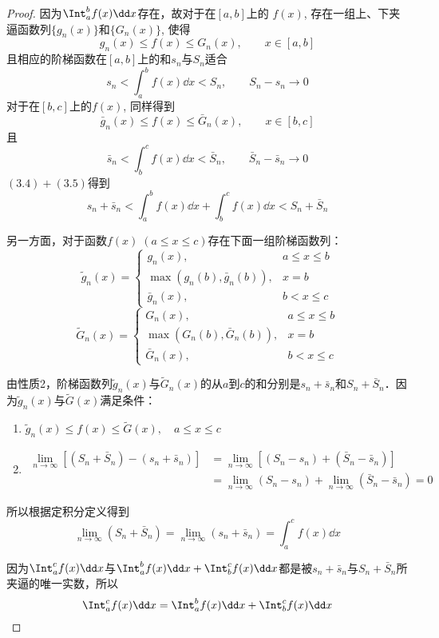 \begin{proof}
因为$\Int^b_a f(x)\dd x$存在，故对于在$[a,b]$上的
$f(x)$, 存在一组上、下夹逼函数列$\{g_n(x)\}$和$\{G_n(x)\}$, 使得
\[g_n (x) \le f (x) \le G_n (x),\qquad x\in [a,b]\]
且相应的阶梯函数在$[a,b]$上的和$s_n$与$S_n$适合
\begin{equation}
    s_n<\int^b_a f(x)\dd x<S_n,\qquad S_n-s_n\to 0
\end{equation}
对于在$[b,c]$上的$f(x)$, 同样得到
\[\bar g_n (x) \le f (x) \le \bar G_n (x),\qquad x\in [b,c]\]
且
\begin{equation}
    \bar  s_n<\int^c_b f(x)\dd x<\bar S_n,\qquad \bar S_n-\bar s_n\to 0
\end{equation}
$(3.4)+(3.5)$得到
\begin{equation}
    s_n+ \bar  s_n<\int^b_a f(x)\dd x+\int^c_b f(x)\dd x<S_n+\bar S_n
\end{equation}

另一方面，对于函数$f(x)\; (a\le x\le c)$存在下面一组阶梯函数列：
\[\tilde g_n(x)=\begin{cases}
    g_n(x),  &  a\le x\le b\\
    \max\left(g_n(b), \bar g_n(b)\right),  &  x=b\\
    \bar g_n(x), & b<x\le c
\end{cases}\]
\[\tilde G_n(x)=\begin{cases}
    G_n(x),  &  a\le x\le b\\
    \max\left(G_n(b), \bar G_n(b)\right),  &  x=b\\
    \bar G_n(x), & b<x\le c
\end{cases}\]

由性质2，阶梯函数列$\tilde g_n(x)$与$\tilde G_n(x)$的从$a$到$c$的和分别是$s_n+\bar s_n$和$S_n+\bar S_n$．因为$\tilde g_n(x)$与$\tilde G(x)$满足条件：
\begin{enumerate}
    \item $\tilde g_n(x)\le f(x)\le \tilde G(x),\quad a\le x\le c$
    \item 
    \begin{align*}
    \lim_{n\to\infty}\left[(S_n+\bar S_n)-(s_n+\bar s_n)\right]&=\lim_{n\to\infty}\left[(S_n-s_n)+(\bar S_n-\bar s_n)\right]\\
    &=\lim_{n\to\infty}(S_n-s_n)+\lim_{n\to\infty}(\bar S_n-\bar s_n)=0
    \end{align*}
\end{enumerate}
所以根据定积分定义得到
\[\lim_{n\to\infty}(S_n+\bar S_n)=\lim_{n\to\infty}(s_n+\bar s_n)=\int^c_a f(x)\dd x \]

因为$\Int^c_a f(x)\dd x $与$\Int^b_a f(x)\dd x +\Int^c_b f(x)\dd x $都是被$s_n+\bar s_n$与$S_n+\bar S_n$所夹逼的唯一实数，所以
\[\Int^c_a f(x)\dd x=\Int^b_a f(x)\dd x +\Int^c_b f(x)\dd x\]
\end{proof}

